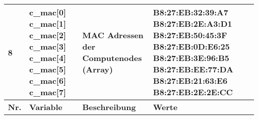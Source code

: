 \begin{longtable}{| p{0.5cm} | p{3cm} | p{8.5cm} | p{4cm} |}
8 &  c\_mac[0] \newline  c\_mac[1] \newline c\_mac[2] \newline c\_mac[3] \newline c\_mac[4] \newline c\_mac[5] \newline c\_mac[6] \newline c\_mac[7]  & MAC Adressen der Computenodes (Array) & B8:27:EB:32:39:A7 \newline B8:27:EB:2E:A3:D1 \newline B8:27:EB:50:45:3F \newline B8:27:EB:0D:E6:25 \newline B8:27:EB:3E:96:B5 \newline B8:27:EB:EE:77:DA \newline B8:27:EB:21:63:E6 \newline B8:27:EB:2E:2E:CC \\\hline 
\rowcolor{heading} \textbf{Nr.} & \textbf{Variable} & \textbf{Beschreibung} &\textbf{Werte} \\\hline

\end{longtable}
